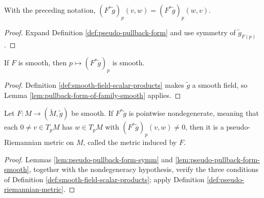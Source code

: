 \begin{lemma}
\label{lem:pseudo-pullback-form-symm}
\leanok
{}
With the preceding notation, $(F^*\widetilde g)_p(v,w)=(F^*\widetilde g)_p(w,v)$.
\end{lemma}
\begin{proof}
\leanok
{}
\sketch Expand Definition \ref{def:pseudo-pullback-form} and use symmetry of $\widetilde g_{F(p)}$.
\end{proof}

\begin{lemma}
\label{lem:pseudo-pullback-form-smooth}
\leanok
{}
If $F$ is smooth, then $p\mapsto(F^*\widetilde g)_p$ is smooth.
\end{lemma}
\begin{proof}
\leanok
{}
\sketch Definition \ref{def:smooth-field-scalar-products} makes $\widetilde g$ a smooth field, so Lemma \ref{lem:pullback-form-of-family-smooth} applies.
\end{proof}

\begin{definition}
\label{def:pseudo-induced-metric}
\leanok
{}
Let $F:M\to(\widetilde M,\widetilde g)$ be smooth. If $F^*\widetilde g$ is pointwise nondegenerate, meaning that each $0\ne v\in T_pM$ has $w\in T_pM$ with $(F^*\widetilde g)_p(v,w)\ne0$, then it is a pseudo-Riemannian metric on $M$, called the metric induced by $F$.
\end{definition}
\begin{proof}
\leanok
{}
\sketch Lemmas \ref{lem:pseudo-pullback-form-symm} and \ref{lem:pseudo-pullback-form-smooth}, together with the nondegeneracy hypothesis, verify the three conditions of Definition \ref{def:smooth-field-scalar-products}; apply Definition \ref{def:pseudo-riemannian-metric}.
\end{proof}

